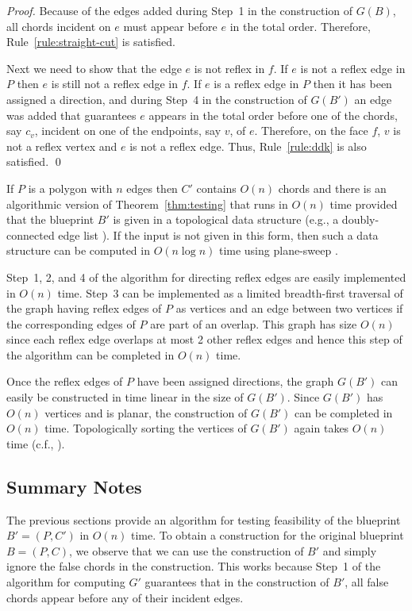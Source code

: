 \documentclass{elsart}
\newenvironment{proof}{\emph{Proof.}}{\qed}
\begin{document}
\begin{proof}
  Because of the edges added during Step~1 in the construction of $G(B)$, all
  chords incident on $e$ must appear before $e$ in the total order. Therefore,
  Rule~\ref{rule:straight-cut} is satisfied.
  
  Next we need to show that the edge $e$ is not reflex in $f$.  If $e$ is not a
  reflex edge in $P$ then $e$ is still not a reflex edge in $f$. If $e$ is a
  reflex edge in $P$ then it has been assigned a direction, and during Step~4
  in the construction of $G(B')$ an edge was added that guarantees $e$ appears
  in the total order before one of the chords, say $c_v$, incident on one of
  the endpoints, say $v$, of $e$.  Therefore, on the face $f$, $v$ is not a
  reflex vertex and $e$ is not a reflex edge.  Thus, Rule~\ref{rule:ddk} is
  also satisfied.
\end{proof}

If $P$ is a polygon with $n$ edges then $C'$ contains $O(n)$ chords
and there is an algorithmic version of Theorem~\ref{thm:testing} that
runs in $O(n)$ time provided that the blueprint $B'$ is given in a
topological data structure (e.g., a doubly-connected edge list
\cite{ps85}).  If the input is not given in this form, then such a
data structure can be computed in $O(n\log n)$ time using plane-sweep
\cite{bo79}.

Step~1, 2, and 4 of the algorithm for directing reflex edges are easily
implemented in $O(n)$ time.  Step~3 can be implemented as a limited
breadth-first traversal of the graph having reflex edges of $P$ as vertices and
an edge between two vertices if the corresponding edges of $P$ are part of an
overlap. This graph has size $O(n)$ since each reflex edge overlaps at most 2
other reflex edges and hence this step of the algorithm can be completed in
$O(n)$ time.

Once the reflex edges of $P$ have been assigned directions, the graph $G(B')$
can easily be constructed in time linear in the size of $G(B')$.  Since $G(B')$
has $O(n)$ vertices and is planar, the construction of $G(B')$ can be completed
in $O(n)$ time.  Topologically sorting the vertices of $G(B')$ again takes
$O(n)$ time (c.f., \cite{clr90}).

\subsection{Summary Notes}

The previous sections provide an algorithm for testing feasibility of
the blueprint $B'=(P,C')$ in $O(n)$ time.  To obtain a construction
for the original blueprint $B=(P,C)$, we observe that we can use the
construction of $B'$ and simply ignore the false chords in the
construction.  This works because Step~1 of the algorithm for computing
$G'$ guarantees that in the construction of $B'$, all false chords appear
before any of their incident edges.
\end{document}
